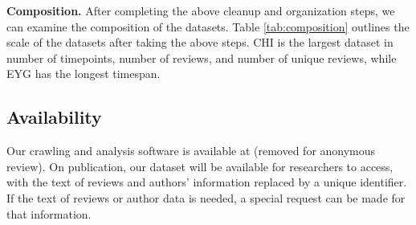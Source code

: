 \textbf{Composition.} After completing the above cleanup and organization steps, we can examine the composition of the datasets. Table \ref{tab:composition} outlines the scale of the datasets after taking the above steps. CHI is the largest dataset in number of timepoints, number of reviews, and number of unique reviews, while EYG has the longest timespan.

\begin{table*}[]
    \centering
    \caption{Composition of the datasets. ``\# reviews'' is the number of reviews collected; each review counts each time it is observed. ``\# unique reviews'' is the number of unique review texts. ``\# businesses'' is the number of businesses for which we observed any reviews. The ``\# authors'' range lower bound assumes all unmatched authors of Not Recommended reviews have a Recommended review in the dataset; the upper bound assumes they do not.
    ``\% Recommended'' is averaged across all time-points. EYG data includes reviews from \citet{mukherjee2013yelp}'s crawl.}
    \label{tab:composition}
\end{table*}

\subsection{Availability}
Our crawling and analysis software is available at (removed for anonymous review). On publication, our dataset will be available for researchers to access, with the text of reviews and authors' information replaced by a unique identifier. If the text of reviews or author data is needed, a special request can be made for that information.
